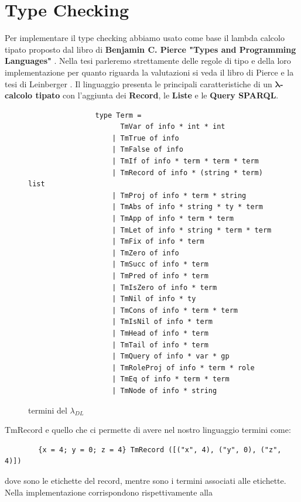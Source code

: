 \section{Type Checking} \label{sec:Type Checking}
        Per implementare il type checking abbiamo usato come base il lambda calcolo tipato proposto dal libro di \textbf{Benjamin C. Pierce "Types and Programming Languages"} \cite{TypesAndProgrammingLanguages}.
        Nella tesi parleremo strettamente delle regole di tipo e della loro implementazione per quanto riguarda la valutazioni si veda il libro di Pierce e la tesi di Leinberger \cite{leinbergerphdthesis}.
        Il linguaggio presenta le principali caratteristiche di un \textbf{ $\boldsymbol{\lambda}$-calcolo tipato} con l'aggiunta dei \textbf{Record}, le \textbf{Liste} e le \textbf{Query SPARQL}.
        \begin{figure}[h] 
            \begin{verbatim}
                type Term =
                      TmVar of info * int * int 
                    | TmTrue of info 
                    | TmFalse of info 
                    | TmIf of info * term * term * term 
                    | TmRecord of info * (string * term) list 
                    | TmProj of info * term * string 
                    | TmAbs of info * string * ty * term 
                    | TmApp of info * term * term 
                    | TmLet of info * string * term * term 
                    | TmFix of info * term 
                    | TmZero of info 
                    | TmSucc of info * term 
                    | TmPred of info * term 
                    | TmIsZero of info * term 
                    | TmNil of info * ty 
                    | TmCons of info * term * term 
                    | TmIsNil of info * term 
                    | TmHead of info * term 
                    | TmTail of info * term  
                    | TmQuery of info * var * gp
                    | TmRoleProj of info * term * role
                    | TmEq of info * term * term
                    | TmNode of info * string
            \end{verbatim}
        \caption{termini del $\lambda_{DL}$}
        \end{figure}
        TmRecord e quello che ci permette di avere nel nostro linguaggio termini come:
        \begin{verbatim}
        {x = 4; y = 0; z = 4} TmRecord ([("x", 4), ("y", 0), ("z", 4)])
        \end{verbatim}
        dove  sono le etichette del record, mentre  sono i termini associati alle etichette. Nella implementazione corrispondono rispettivamente alla
